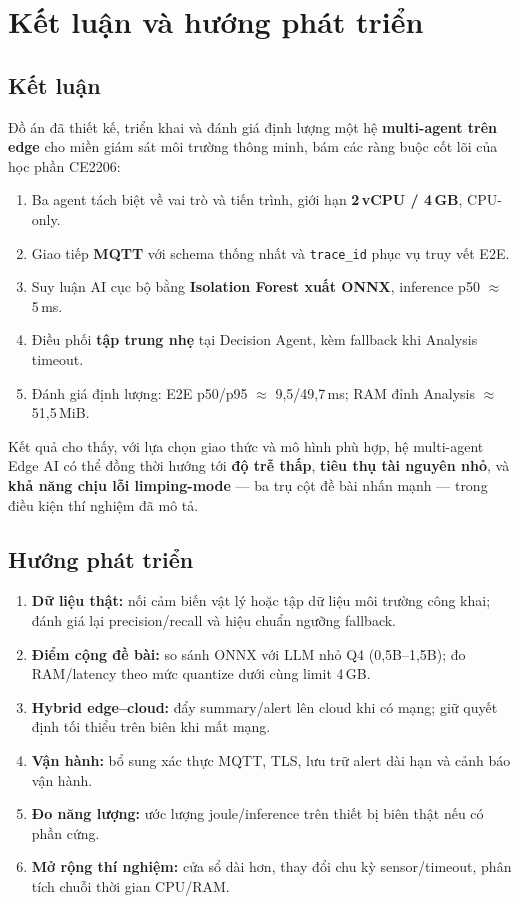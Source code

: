 \documentclass[12pt,a4paper,oneside]{report}
\newcommand{\code}[1]{\texttt{#1}}
\begin{document}
\chapter{Kết luận và hướng phát triển}

\section{Kết luận}

Đồ án đã thiết kế, triển khai và đánh giá định lượng một hệ \textbf{multi-agent trên edge} cho miền giám sát môi trường thông minh, bám các ràng buộc cốt lõi của học phần CE2206:
\begin{enumerate}
  \item Ba agent tách biệt về vai trò và tiến trình, giới hạn \textbf{2\,vCPU / 4\,GB}, CPU-only.
  \item Giao tiếp \textbf{MQTT} với schema thống nhất và \code{trace\_id} phục vụ truy vết E2E.
  \item Suy luận AI cục bộ bằng \textbf{Isolation Forest xuất ONNX}, inference p50 $\approx$ 5\,ms.
  \item Điều phối \textbf{tập trung nhẹ} tại Decision Agent, kèm fallback khi Analysis timeout.
  \item Đánh giá định lượng: E2E p50/p95 $\approx$ 9,5/49,7\,ms; RAM đỉnh Analysis $\approx$ 51,5\,MiB.
\end{enumerate}

Kết quả cho thấy, với lựa chọn giao thức và mô hình phù hợp, hệ multi-agent Edge AI có thể đồng thời hướng tới \textbf{độ trễ thấp}, \textbf{tiêu thụ tài nguyên nhỏ}, và \textbf{khả năng chịu lỗi limping-mode} --- ba trụ cột đề bài nhấn mạnh --- trong điều kiện thí nghiệm đã mô tả.

\section{Hướng phát triển}

\begin{enumerate}
  \item \textbf{Dữ liệu thật:} nối cảm biến vật lý hoặc tập dữ liệu môi trường công khai; đánh giá lại precision/recall và hiệu chuẩn ngưỡng fallback.
  \item \textbf{Điểm cộng đề bài:} so sánh ONNX với LLM nhỏ Q4 (0,5B--1,5B); đo RAM/latency theo mức quantize dưới cùng limit 4\,GB.
  \item \textbf{Hybrid edge--cloud:} đẩy summary/alert lên cloud khi có mạng; giữ quyết định tối thiểu trên biên khi mất mạng.
  \item \textbf{Vận hành:} bổ sung xác thực MQTT, TLS, lưu trữ alert dài hạn và cảnh báo vận hành.
  \item \textbf{Đo năng lượng:} ước lượng joule/inference trên thiết bị biên thật nếu có phần cứng.
  \item \textbf{Mở rộng thí nghiệm:} cửa sổ dài hơn, thay đổi chu kỳ sensor/timeout, phân tích chuỗi thời gian CPU/RAM.
\end{enumerate}
\end{document}
